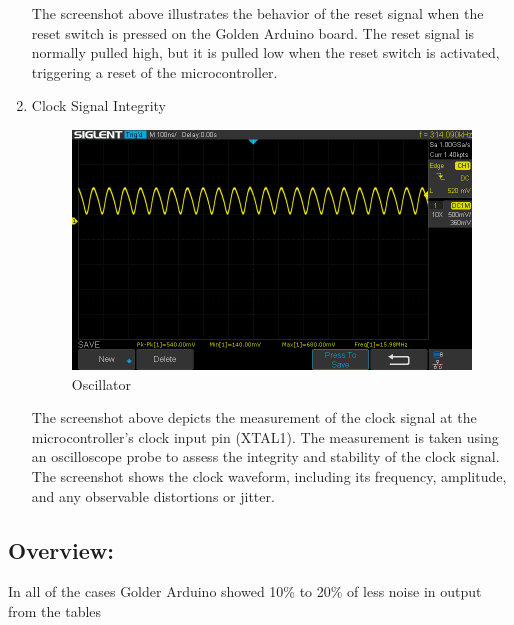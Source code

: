 \documentclass[a4paper,11pt]{article}%
\begin{document}
\begin{enumerate}
	The screenshot above illustrates the behavior of the reset signal when the reset switch is pressed on the Golden Arduino board. The reset signal is normally pulled high, but it is pulled low when the reset switch is activated, triggering a reset of the microcontroller.

	\item Clock Signal Integrity
	\begin{figure}[H]
		\centering
		\includegraphics[scale=0.6]{figures/oscillator_16Mhz.png}
		\caption{Oscillator}
	\end{figure}
	
	 The screenshot above depicts the measurement of the clock signal at the microcontroller's clock input pin (XTAL1). The measurement is taken using an oscilloscope probe to assess the integrity and stability of the clock signal. The screenshot shows the clock waveform, including its frequency, amplitude, and any observable distortions or jitter.
\end{enumerate}






\subsection{\textbf{Overview:}}

In all of the cases Golder Arduino showed 10\% to 20\% of less noise in output from the tables
\end{document}
